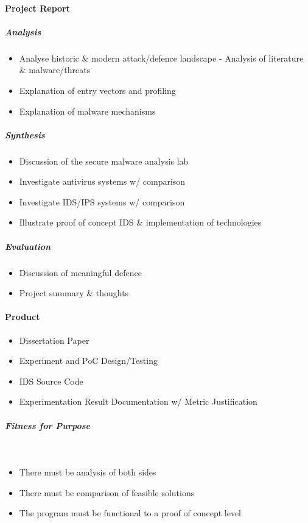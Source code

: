 \paragraph{Project Report}
\subparagraph{Analysis}
\begin{itemize}
	\item Analyse historic \& modern attack/defence landscape - Analysis of
		literature \& malware/threats 
	\item Explanation of entry vectors and profiling
	\item Explanation of malware mechanisms
\end{itemize}

\subparagraph{Synthesis}
\begin{itemize}
	\item {Discussion of the secure malware analysis lab}
	\item Investigate antivirus systems w/ comparison
	\item Investigate IDS/IPS systems w/ comparison
	\item Illustrate proof of concept IDS \& implementation of technologies
\end{itemize}

\subparagraph{Evaluation}
\begin{itemize}
	\item Discussion of meaningful defence
	\item Project summary \& thoughts
\end{itemize}

\paragraph{Product}
\begin{itemize}
	\item Dissertation Paper
	\item Experiment and PoC Design/Testing
	\item IDS Source Code
	\item Experimentation Result Documentation w/ Metric Justification
\end{itemize}

\subparagraph{Fitness for Purpose}~
\begin{itemize}
	\item There must be analysis of both sides
	\item There must be comparison of feasible solutions
	\item The program must be functional to a proof of concept level
\end{itemize}

